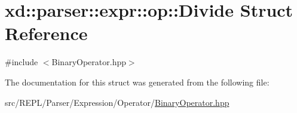 \hypertarget{structxd_1_1parser_1_1expr_1_1op_1_1_divide}{}\section{xd\+:\+:parser\+:\+:expr\+:\+:op\+:\+:Divide Struct Reference}
\label{structxd_1_1parser_1_1expr_1_1op_1_1_divide}


{\ttfamily \#include $<$Binary\+Operator.\+hpp$>$}



The documentation for this struct was generated from the following file\+:\begin{DoxyCompactItemize}
\item 
src/\+R\+E\+P\+L/\+Parser/\+Expression/\+Operator/\mbox{\hyperlink{_binary_operator_8hpp}{Binary\+Operator.\+hpp}}\end{DoxyCompactItemize}
